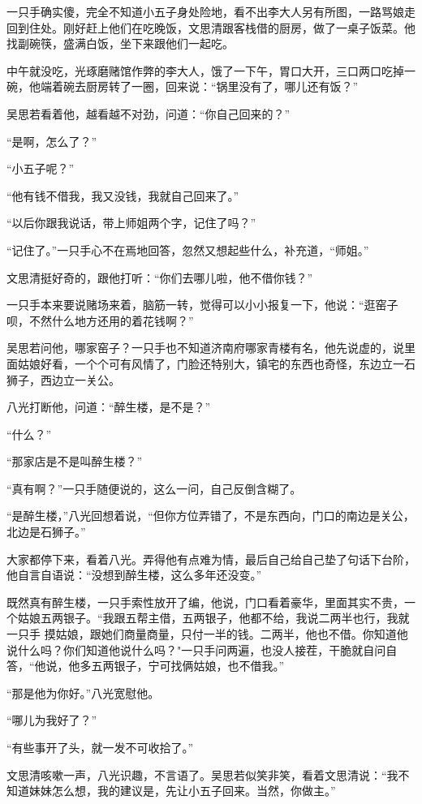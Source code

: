 一只手确实傻，完全不知道小五子身处险地，看不出李大人另有所图，一路骂娘走回到住处。刚好赶上他们在吃晚饭，文思清跟客栈借的厨房，做了一桌子饭菜。他找副碗筷，盛满白饭，坐下来跟他们一起吃。

中午就没吃，光琢磨赌馆作弊的李大人，饿了一下午，胃口大开，三口两口吃掉一碗，他端着碗去厨房转了一圈，回来说：“锅里没有了，哪儿还有饭？”

吴思若看着他，越看越不对劲，问道：“你自己回来的？”

“是啊，怎么了？”

“小五子呢？”

“他有钱不借我，我又没钱，我就自己回来了。”

“以后你跟我说话，带上师姐两个字，记住了吗？”

“记住了。”一只手心不在焉地回答，忽然又想起些什么，补充道，“师姐。”

文思清挺好奇的，跟他打听：“你们去哪儿啦，他不借你钱？”

一只手本来要说赌场来着，脑筋一转，觉得可以小小报复一下，他说：“逛窑子呗，不然什么地方还用的着花钱啊？”

吴思若问他，哪家窑子？一只手也不知道济南府哪家青楼有名，他先说虚的，说里面姑娘好看，一个个可有风情了，门脸还特别大，镇宅的东西也奇怪，东边立一石狮子，西边立一关公。

八光打断他，问道：“醉生楼，是不是？”

“什么？”

“那家店是不是叫醉生楼？”

“真有啊？”一只手随便说的，这么一问，自己反倒含糊了。

“是醉生楼，”八光回想着说，“但你方位弄错了，不是东西向，门口的南边是关公，北边是石狮子。”

大家都停下来，看着八光。弄得他有点难为情，最后自己给自己垫了句话下台阶，他自言自语说：“没想到醉生楼，这么多年还没变。”

既然真有醉生楼，一只手索性放开了编，他说，门口看着豪华，里面其实不贵，一个姑娘五两银子。“我跟五帮主借，五两银子，他都不给，我说二两半也行，我就一只手 摸姑娘，跟她们商量商量，只付一半的钱。二两半，他也不借。你知道他说什么吗？你们知道他说什么吗？"一只手问两遍，也没人接茬，干脆就自问自答，“他说，他多五两银子，宁可找俩姑娘，也不借我。”

“那是他为你好。”八光宽慰他。

“哪儿为我好了？”

“有些事开了头，就一发不可收拾了。”

文思清咳嗽一声，八光识趣，不言语了。吴思若似笑非笑，看着文思清说：“我不知道妹妹怎么想，我的建议是，先让小五子回来。当然，你做主。”

